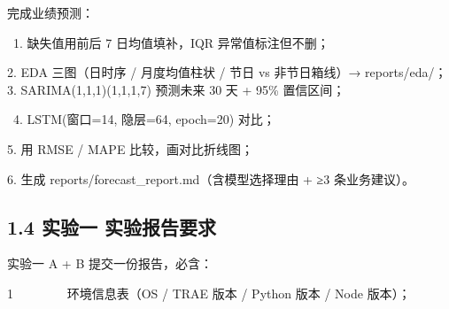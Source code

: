 \documentclass[
  american,
  chinese,
]{ctexart}
\begin{document}
{完成业绩预测：}\foreignlanguage{american}{}

\foreignlanguage{american}{{~}1. }{{缺失值}}{用前后}\foreignlanguage{american}{ 7 }{日均值填补，}\foreignlanguage{american}{IQR }{异常值标注但不{删}；}{ \foreignlanguage{american}{}}

\foreignlanguage{american}{2. }\foreignlanguage{american}{EDA }{\foreignlanguage{american}{三图（日时序}}\foreignlanguage{american}{ / }{\foreignlanguage{american}{月度均值柱状}}\foreignlanguage{american}{ / }{\foreignlanguage{american}{节日}}\foreignlanguage{american}{ vs }{\foreignlanguage{american}{非节日箱线}}\foreignlanguage{american}{）}\foreignlanguage{american}{→ reports/{eda}/}\foreignlanguage{american}{；}\foreignlanguage{american}{ 3. {SARIMA(}1,1,{1)(}1,1,1,7) }{\foreignlanguage{american}{预测未来}}\foreignlanguage{american}{ 30 }\foreignlanguage{american}{天}\foreignlanguage{american}{ + 95\% }{{\foreignlanguage{american}{置信区间}}}{\foreignlanguage{american}{；}}\foreignlanguage{american}{}

\foreignlanguage{american}{{~}4. {LSTM(}}{\foreignlanguage{american}{窗口}}\foreignlanguage{american}{=14, }{\foreignlanguage{american}{隐层}}\foreignlanguage{american}{=64, epoch=20) }{{\foreignlanguage{american}{对比}}}{\foreignlanguage{american}{；}}\foreignlanguage{american}{ }

\foreignlanguage{american}{5. }{用}\foreignlanguage{american}{ RMSE / MAPE }{比较，画对比折线图；}{ \foreignlanguage{american}{}}

\foreignlanguage{american}{6. }{\foreignlanguage{american}{生成}}\foreignlanguage{american}{ reports/{forecast\_report.md{（含模型选择理由}}
+ ≥3 }{\foreignlanguage{american}{条业务建议}}\foreignlanguage{american}{）。}\foreignlanguage{american}{ }\foreignlanguage{american}{}

\subsection{\texorpdfstring{\foreignlanguage{american}{1.4 }{实验{一}}{ }{实验报告要求}\foreignlanguage{american}{}}{1.4 实验一 实验报告要求}}\label{ux5b9eux9a8cux4e00-ux5b9eux9a8cux62a5ux544aux8981ux6c42}

{实验{一}}\foreignlanguage{american}{ A + B }{提交一份报告，必含：}\foreignlanguage{american}{}

\foreignlanguage{american}{{1{~~~~~~~~
}}}{\foreignlanguage{american}{环境信息表（}\foreignlanguage{american}{OS}}\foreignlanguage{american}{ / TRAE }{\foreignlanguage{american}{版本}}\foreignlanguage{american}{ / Python }{\foreignlanguage{american}{版本}}\foreignlanguage{american}{ / Node }{\foreignlanguage{american}{版本}}{\foreignlanguage{american}{）；}}
\end{document}
